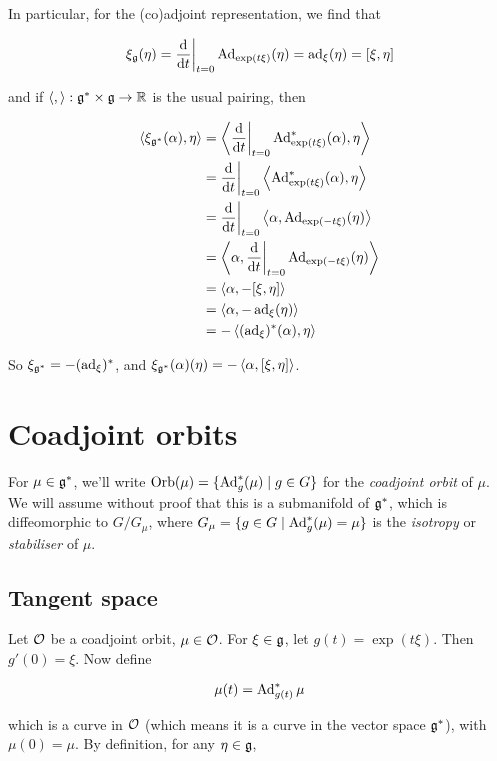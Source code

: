 \documentclass{article}
\begin{document}
In particular, for the (co)adjoint representation, we find that

\[\xi_{\mathfrak{g}}(\eta) = \dv{t}\bigg\vert_{t=0}\operatorname{Ad}_{\exp(t\xi)}(\eta) = \operatorname{ad}_\xi(\eta) = [\xi, \eta]\]

and if \(\left\langle , \right\rangle : \mathfrak{g}^* \times \mathfrak{g} \to \mathbb{R}\) is the usual pairing, then

\begin{align*}
    \left\langle \xi_{\mathfrak{g}^*}(\alpha), \eta \right\rangle &= \left\langle \dv{t}\bigg\vert_{t=0}\operatorname{Ad}_{\exp(t\xi)}^*(\alpha), \eta \right\rangle \\
    &= \dv{t}\bigg\vert_{t=0}\left\langle \operatorname{Ad}_{\exp(t\xi)}^*(\alpha), \eta \right\rangle \\
    &= \dv{t}\bigg\vert_{t=0}\left\langle \alpha, \operatorname{Ad}_{\exp(-t\xi)}(\eta) \right\rangle \\
    &= \left\langle \alpha, \dv{t}\bigg\vert_{t=0}\operatorname{Ad}_{\exp(-t\xi)}(\eta) \right\rangle \\
    &= \left\langle \alpha, -[\xi, \eta] \right\rangle \\
    &= \left\langle \alpha, -\operatorname{ad}_\xi(\eta) \right\rangle \\
    &= -\left\langle (\operatorname{ad}_\xi)^*(\alpha), \eta \right\rangle
\end{align*}

So \(\xi_{\mathfrak{g}^*} = -(\operatorname{ad}_\xi)^*\), and \(\xi_{\mathfrak{g}^*}(\alpha)(\eta) = -\left\langle \alpha, [\xi, \eta] \right\rangle\).

\section{Coadjoint orbits}

For \(\mu \in \mathfrak{g}^*\), we'll write \(\operatorname{Orb}(\mu) = \{\operatorname{Ad}_g^*(\mu) \mid g \in G\}\) for the \emph{coadjoint orbit} of \(\mu\). We will assume without proof that this is a submanifold of \(\mathfrak{g}^*\), which is diffeomorphic to \(G/G_\mu\), where \(G_\mu = \{g \in G \mid \operatorname{Ad}_g^*(\mu) = \mu\}\) is the \emph{isotropy} or \emph{stabiliser} of \(\mu\).

\subsection{Tangent space}

Let \(\mathcal{O}\) be a coadjoint orbit, \(\mu \in \mathcal{O}\). For \(\xi \in \mathfrak{g}\), let \(g(t) = \exp(t\xi)\). Then \(g'(0) = \xi\). Now define

\[\mu(t) = \operatorname{Ad}^*_{g(t)}\mu\]

which is a curve in \(\mathcal{O}\) (which means it is a curve in the vector space \(\mathfrak{g}^*\)), with \(\mu(0) = \mu\). By definition, for any \(\eta \in \mathfrak{g}\),
\end{document}
